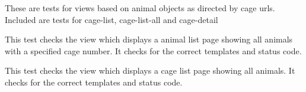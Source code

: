 \documentclass[letterpaper,10pt,english]{sphinxmanual}
\begin{document}
\begin{fulllineitems}
\label{animals:mousedb.animal.tests.CageViewTests}
These are tests for views based on animal objects as directed by cage urls.  Included are tests for cage-list, cage-list-all and cage-detail

\begin{fulllineitems}
\label{animals:mousedb.animal.tests.CageViewTests.test_cage_detail}
This test checks the view which displays a animal list page showing all animals with a specified cage number.  It checks for the correct templates and status code.

\end{fulllineitems}


\begin{fulllineitems}
\label{animals:mousedb.animal.tests.CageViewTests.test_cage_list}
This test checks the view which displays a cage list page showing all animals.  It checks for the correct templates and status code.

\end{fulllineitems}


\end{fulllineitems}

\end{document}
